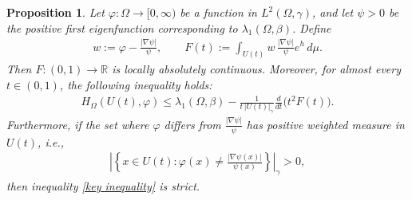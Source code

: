 \documentclass[11pt,leqno]{amsart}
\newtheorem{prop}{Proposition}[section]
\numberwithin{equation}{section}
\begin{document}
\begin{prop}\label{Key prop}
Let $\varphi:\Omega\to [0,\infty)$ be a function in $L^{2}(\Omega,\gamma)$, and let $\psi>0$ be the positive first eigenfunction corresponding to $\lambda_{1}(\Omega,\beta)$. Define
\begin{align}
    w := \varphi - \frac{|\nabla \psi|}{\psi}, \qquad F(t) := \int_{U(t)}w\,\frac{|\nabla\psi|}{\psi}e^{h}\,d\mu.
\end{align}
Then $F:(0,1)\to \mathbb{R}$ is locally absolutely continuous. Moreover, for almost every $t\in(0,1)$, the following inequality holds:
\begin{align}\label{key inequality}
    H_{\Omega}(U(t),\varphi) \leq \lambda_{1}(\Omega,\beta) - \frac{1}{t\,|U(t)|_\gamma}\frac{d}{dt}\big(t^{2}F(t)\big).
\end{align}
Furthermore, if the set where $\varphi$ differs from $\frac{|\nabla\psi|}{\psi}$ has positive weighted measure in $U(t)$, i.e.,
\begin{align*}
\left|\left\{x\in U(t): \varphi(x)\neq \frac{|\nabla\psi(x)|}{\psi(x)}\right\}\right|_{\gamma} > 0,
\end{align*}
then inequality \eqref{key inequality} is strict.
\end{prop}
\end{document}
